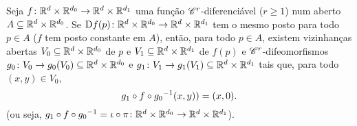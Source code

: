 \begin{proposition}
Seja $f\colon \mathbb{R}^{d} \times \mathbb{R}^{d_0} \to \mathbb{R}^{d} \times \mathbb{R}^{d_1}$ uma função $\mathscr{C}^r$-diferenciável ($r \geq 1$) num aberto $A \subseteq \mathbb{R}^{d} \times \mathbb{R}^{d_0}$. Se $\mathrm{D} f(p)\colon \mathbb{R}^{d} \times \mathbb{R}^{d_0} \to \mathbb{R}^{d} \times \mathbb{R}^{d_1}$ tem o mesmo posto para todo $p \in A$ ($f$ tem posto constante em $A$), então, para todo $p \in A$, existem vizinhanças abertas $V_0 \subseteq \mathbb{R}^{d} \times \mathbb{R}^{d_0}$ de $p$ e $V_1 \subseteq \mathbb{R}^{d} \times \mathbb{R}^{d_1}$ de $f(p)$ e $\mathscr{C}^r$-difeomorfismos $g_0\colon V_0 \to g_0(V_0) \subseteq \mathbb{R}^{d} \times \mathbb{R}^{d_0}$ e $g_1\colon V_1 \to g_1(V_1) \subseteq \mathbb{R}^{d} \times \mathbb{R}^{d_1}$ tais que, para todo $(x,y) \in V_0$, 
	\begin{equation*}
	g_1 \circ f \circ {g_0}^{-1}(x,y))=(x,0).
	\end{equation*}
(ou seja, $g_1 \circ f \circ {g_0}^{-1} = \iota \circ \pi\colon \mathbb{R}^{d} \times \mathbb{R}^{d_0} \to \mathbb{R}^{d} \times \mathbb{R}^{d_1}$).
\end{proposition}












